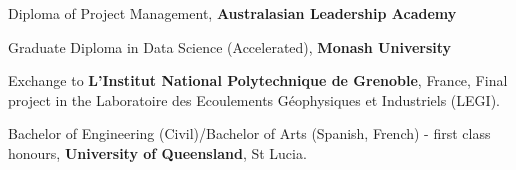 %
%
%


\begin{scholarship}
					{Diploma of Project Management, \textbf{Australasian Leadership Academy}}

					{Graduate Diploma in Data Science (Accelerated), \textbf{Monash University}}

					{Exchange to \textbf{L'Institut National Polytechnique de Grenoble}, France, Final project in the Laboratoire des Ecoulements Géophysiques et Industriels (LEGI).}
					
					{Bachelor of Engineering (Civil)/Bachelor of Arts (Spanish, French) - first class honours, \textbf{University of Queensland}, St Lucia.}

\end{scholarship}